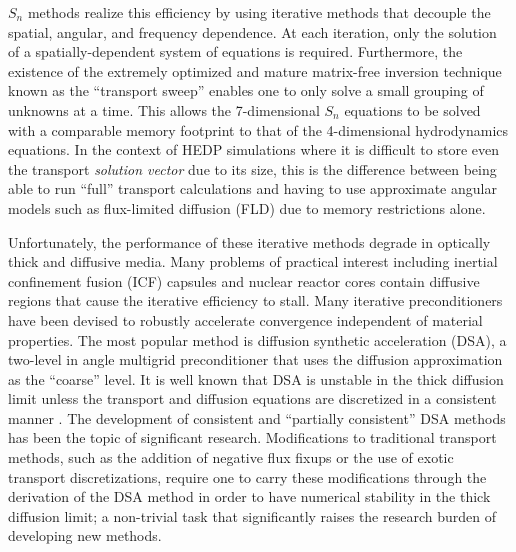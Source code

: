 \documentclass[doc.tex]{subfiles}
\begin{document}
$S_n$ methods realize this efficiency by using iterative methods that decouple the spatial, angular, and frequency dependence. At each iteration, only the solution of a spatially-dependent system of equations is required. Furthermore, the existence of the extremely optimized and mature matrix-free inversion technique known as the ``transport sweep'' enables one to only solve a small grouping of unknowns at a time. This allows the 7-dimensional $S_n$ equations to be solved with a comparable memory footprint to that of the 4-dimensional hydrodynamics equations. In the context of HEDP simulations where it is difficult to store even the transport \emph{solution vector} due to its size, this is the difference between being able to run ``full'' transport calculations and having to use approximate angular models such as flux-limited diffusion (FLD) due to memory restrictions alone. 

Unfortunately, the performance of these iterative methods degrade in optically thick and diffusive media. Many problems of practical interest including inertial confinement fusion (ICF) capsules and nuclear reactor cores contain diffusive regions that cause the iterative efficiency to stall. Many iterative preconditioners have been devised to robustly accelerate convergence independent of material properties. The most popular method is diffusion synthetic acceleration (DSA), a two-level in angle multigrid preconditioner that uses the diffusion approximation as the ``coarse'' level. It is well known that DSA is unstable in the thick diffusion limit unless the transport and diffusion equations are discretized in a consistent manner \cite{A,LarsenDSA}. The development of consistent \cite{WWM} and ``partially consistent'' \cite{ML,AM,WR} DSA methods has been the topic of significant research. Modifications to traditional transport methods, such as the addition of negative flux fixups or the use of exotic transport discretizations, require one to carry these modifications through the derivation of the DSA method in order to have numerical stability in the thick diffusion limit; a non-trivial task that significantly raises the research burden of developing new methods. 
\end{document}
